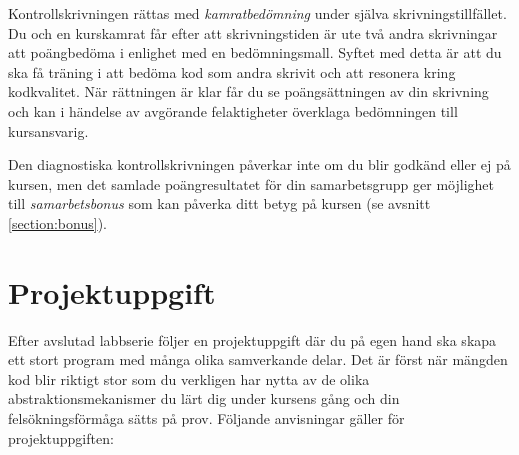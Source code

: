 Kontrollskrivningen rättas med \emph{kamratbedömning} under själva skrivningstillfället. Du och en kurskamrat får efter att skrivningstiden är ute två andra skrivningar att poängbedöma i enlighet med en bedömningsmall. Syftet med detta är att du ska få träning i att bedöma kod som andra skrivit och att resonera kring kodkvalitet. När rättningen är klar får du se poängsättningen av din skrivning och kan i händelse av avgörande felaktigheter överklaga bedömningen till kursansvarig.

Den diagnostiska kontrollskrivningen påverkar inte om du blir godkänd eller ej på kursen, men det samlade poängresultatet för din samarbetsgrupp ger möjlighet till \emph{samarbetsbonus} som kan påverka ditt betyg på kursen (se avsnitt \ref{section:bonus}).

\section{Projektuppgift}\label{section:lab:Projekt}

Efter avslutad labbserie följer en projektuppgift där du på egen hand ska skapa ett stort program med många olika samverkande delar. Det är först när mängden kod blir riktigt stor som du verkligen har nytta av de olika abstraktionsmekanismer du lärt dig under kursens gång och din felsökningsförmåga sätts på prov. Följande anvisningar gäller för projektuppgiften:

